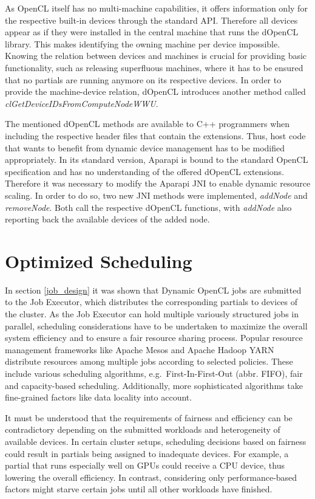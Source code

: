 As OpenCL itself has no multi-machine capabilities, it offers information only for the respective built-in devices through the standard API. Therefore all devices appear as if they were installed in the central machine that runs the dOpenCL library. This makes identifying the owning machine per device impossible. Knowing the relation between devices and machines is crucial for providing basic functionality, such as releasing superfluous machines, where it has to be ensured that no partials are running anymore on its respective devices. In order to provide the machine-device relation, dOpenCL introduces another method called \textit{clGetDeviceIDsFromComputeNodeWWU}.

The mentioned dOpenCL methods are available to C++ programmers when including the respective header files that contain the extensions. Thus, host code that wants to benefit from dynamic device management has to be modified appropriately. In its standard version, Aparapi is bound to the standard OpenCL specification and has no understanding of the offered dOpenCL extensions. Therefore it was necessary to modify the Aparapi JNI to enable dynamic resource scaling. In order to do so, two new JNI methods were implemented, \textit{addNode} and \textit{removeNode}. Both call the respective dOpenCL functions, with \textit{addNode} also reporting back the available devices of the added node.

\section{Optimized Scheduling}
\label{optimized_scheduling}
In section \ref{job_design} it was shown that Dynamic OpenCL jobs are submitted to the Job Executor, which distributes the corresponding partials to devices of the cluster. As the Job Executor can hold multiple variously structured jobs in parallel, scheduling considerations have to be undertaken to maximize the overall system efficiency and to ensure a fair resource sharing process. Popular resource management frameworks like Apache Mesos and Apache Hadoop YARN distribute resources among multiple jobs according to selected policies\cite{mesos}\cite{yarn_paper}. These include various scheduling algorithms, e.g.~First-In-First-Out (abbr. FIFO), fair and capacity-based scheduling. Additionally, more sophisticated algorithms take fine-grained factors like data locality into account.

It must be understood that the requirements of fairness and efficiency can be contradictory depending on the submitted workloads and heterogeneity of available devices. In certain cluster setups, scheduling decisions based on fairness could result in partials being assigned to inadequate devices. For example, a partial that runs especially well on GPUs could receive a CPU device, thus lowering the overall efficiency. In contrast, considering only performance-based factors might starve certain jobs until all other workloads have finished.

